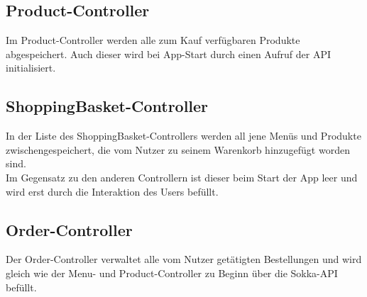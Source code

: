 \subsection{Product-Controller}

Im Product-Controller werden alle zum Kauf verfügbaren Produkte abgespeichert. Auch dieser wird
bei App-Start durch einen Aufruf der API initialisiert.

\subsection{ShoppingBasket-Controller}
\label{basketcontroller}

In der Liste des ShoppingBasket-Controllers werden all jene Menüs und Produkte zwischengespeichert, die 
vom Nutzer zu seinem Warenkorb hinzugefügt worden sind.\\
Im Gegensatz zu den anderen Controllern ist dieser beim Start der App leer und wird erst durch
die Interaktion des Users befüllt.

\subsection{Order-Controller}

Der Order-Controller verwaltet alle vom Nutzer getätigten Bestellungen und wird gleich wie der
Menu- und Product-Controller zu Beginn über die Sokka-API befüllt.